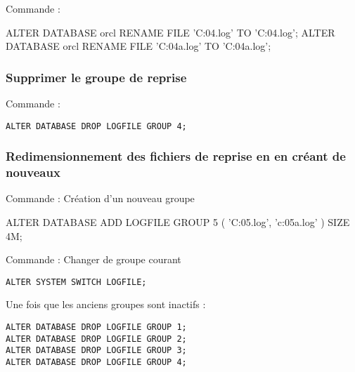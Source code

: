 Commande : 
\begin{verbatimtab}
ALTER DATABASE orcl RENAME
	FILE 'C:\app\isima\oradata\orcl\REDO04.log'
	TO 'C:\app\isima\oradata\orcl{}\REDO04.log';
ALTER DATABASE orcl RENAME
	FILE 'C:\app\isima\oradata\orcl\REDO04a.log'
	TO 'C:\app\isima\oradata\orcl{}\REDO04a.log';
\end{verbatimtab}

\subsubsection{Supprimer le groupe de reprise}

Commande : 
\begin{verbatim}
ALTER DATABASE DROP LOGFILE GROUP 4;
\end{verbatim}


\subsubsection{Redimensionnement des fichiers de reprise en en créant de nouveaux }
Commande : Création d'un nouveau groupe
\begin{verbatimtab}
ALTER DATABASE ADD LOGFILE GROUP 5 (
	'C:\app\isima\oradata\orcl\REDO05.log',
	'c:\app\isima\oradata\orcl\REDO05a.log'
) SIZE 4M;
\end{verbatimtab}

Commande : Changer de groupe courant
\begin{verbatim}
ALTER SYSTEM SWITCH LOGFILE;
\end{verbatim}

Une fois que les anciens groupes sont inactifs :
\begin{verbatim}
ALTER DATABASE DROP LOGFILE GROUP 1;
ALTER DATABASE DROP LOGFILE GROUP 2;
ALTER DATABASE DROP LOGFILE GROUP 3;
ALTER DATABASE DROP LOGFILE GROUP 4;
\end{verbatim}	
